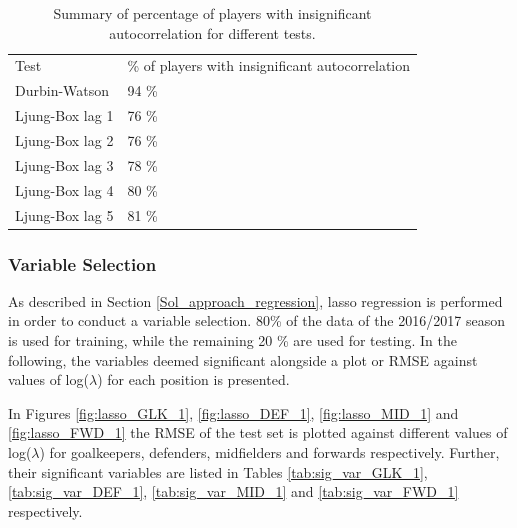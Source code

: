 \begin{table}[H]
\centering
\begin{tabular}{ll}
Test            & \% of players with insignificant autocorrelation \\
Durbin-Watson   & 94 \%                                            \\
Ljung-Box lag 1 & 76 \%                                            \\
Ljung-Box lag 2 & 76 \%                                            \\
Ljung-Box lag 3 & 78 \%                                            \\
Ljung-Box lag 4 & 80 \%                                            \\
Ljung-Box lag 5 & 81 \%                                           
\end{tabular}
\caption{Summary of percentage of players with insignificant autocorrelation for different tests.}
\label{tab:auto_tests}
\end{table}

\subsubsection{Variable Selection}

As described in Section \ref{Sol_approach_regression}, lasso regression is performed in order to conduct a variable selection. 80\% of the data of the 2016/2017 season is used for training, while the remaining 20 \% are used for testing. In the following, the variables deemed significant alongside a plot or RMSE against values of log($\lambda$) for each position is presented.

\newpar

In Figures \ref{fig:lasso_GLK_1}, \ref{fig:lasso_DEF_1}, \ref{fig:lasso_MID_1} and \ref{fig:lasso_FWD_1} the RMSE of the test set is plotted against different values of log($\lambda$) for goalkeepers, defenders, midfielders and forwards respectively. Further, their significant variables are listed in Tables \ref{tab:sig_var_GLK_1}, \ref{tab:sig_var_DEF_1}, \ref{tab:sig_var_MID_1} and \ref{tab:sig_var_FWD_1} respectively.

